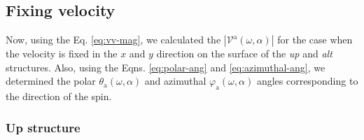 \documentclass[prb,11pt,tightenlines,twocolumn,aps]{revtex4-1}
\begin{document}


\subsection{Fixing velocity} %
\label{sec:res-fixvel}



Now, using the Eq. \eqref{eq:vv-mag}, we calculated the
$|\mathcal{V}^{\mathrm{a}} (\omega,\alpha)|$ for the case when the velocity is
fixed in the $x$ and $y$ direction on the surface of the \emph{up} and
\emph{alt} structures. Also, using the Eqns. \eqref{eq:polar-ang} and 
\eqref{eq:azimuthal-ang}, we determined the polar $\theta_{\mathrm{a}}
(\omega,\alpha)$ and azimuthal $\varphi_{\mathrm{a}} (\omega,\alpha)$ angles
corresponding to the direction of the spin.

\subsubsection{Up structure}
\end{document}
